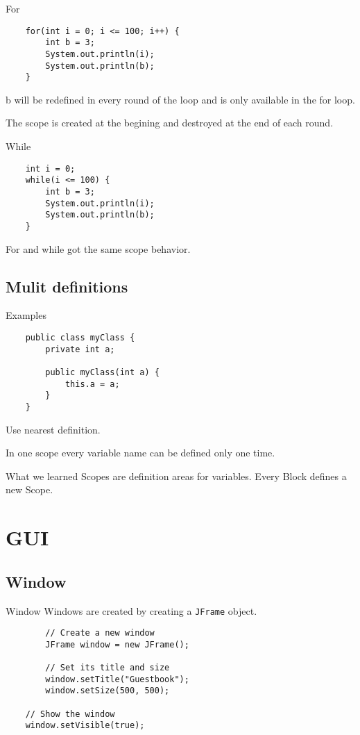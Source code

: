 \begin{frame}[fragile]{For}
    \begin{lstlisting}
    for(int i = 0; i <= 100; i++) {
        int b = 3;
        System.out.println(i);
        System.out.println(b);
    }\end{lstlisting}
    
    b will be redefined in every round of the loop and is only available in the for loop.
    
    The scope is created at the begining and destroyed at the end of each round.
\end{frame}

\begin{frame}[fragile]{While}
    \begin{lstlisting}
    int i = 0;
    while(i <= 100) {
        int b = 3;
        System.out.println(i);
        System.out.println(b);
    }\end{lstlisting}
    
    For and while got the same scope behavior.
\end{frame}
  
\subsection{Mulit definitions}
\begin{frame}[fragile]{Examples}
    \begin{lstlisting}
    public class myClass {
        private int a;
    
        public myClass(int a) {
            this.a = a;
        }
    }\end{lstlisting}

    Use nearest definition.

    In one scope every variable name can be defined only one time.
\end{frame}

\begin{frame}{What we learned}
    Scopes are definition areas for variables.
    Every Block defines a new Scope.
\end{frame}
    
\section{GUI}
\subsection{Window}
\begin{frame}[fragile]{Window}
  Windows are created by creating a \texttt{JFrame} object.
    \begin{lstlisting}
        // Create a new window
        JFrame window = new JFrame();

        // Set its title and size
        window.setTitle("Guestbook");
        window.setSize(500, 500);
    
    // Show the window
    window.setVisible(true);\end{lstlisting}
\end{frame}

